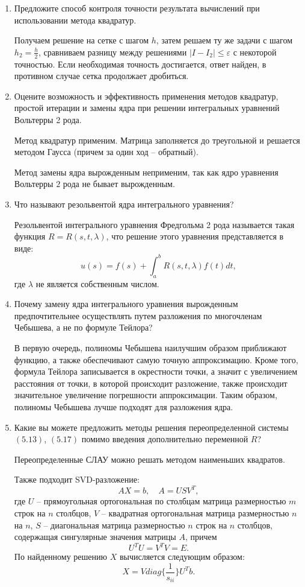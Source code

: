 \documentclass[12pt, a4paper]{article}
\begin{document}
\begin{enumerate}
\item Предложите способ контроля точности результата вычислений при использовании метода квадратур.

Получаем решение на сетке с шагом $ h $, затем решаем ту же задачи с шагом  $ h_2 = \frac{h}{2} $, сравниваем разницу между решениями $ |I -I_2| \leq \varepsilon $ с некоторой точностью. Если необходимая точность достигается, ответ найден, в противном случае сетка продолжает дробиться.  

\item Оцените возможность и эффективность применения методов квадратур, простой итерации и замены ядра при решении интегральных уравнений Вольтерры 2 рода.

Метод квадратур применим. Матрица заполняется до треугольной и решается методом Гаусса (причем за один ход – обратный). 

Метод замены ядра вырожденным неприменим, так как ядро уравнения Вольтерры $2$ рода не бывает вырожденным.

\item Что называют резольвентой ядра интегрального уравнения?

Резольвентой интегрального уравнения Фредгольма 2 рода называется такая функция $ R = R(s, t, \lambda) $, что решение этого уравнения представляется в виде:
\[
u(s) = f(s) + \displaystyle \int_a^b R(s, t, \lambda) f(t) dt,
\]
где $\lambda$ не является собственным числом.
\item Почему замену ядра интегрального уравнения вырожденным предпочтительнее осуществлять путем разложения по многочленам Чебышева, а не по формуле Тейлора?

В первую очередь, полиномы Чебышева наилучшим образом приближают функцию, а также обеспечивают самую точную аппроксимацию. Кроме того, формула Тейлора записывается в окрестности точки, а значит с увеличением расстояния от точки, в которой происходит разложение, также происходит значительное увеличение погрешности аппроксимации. Таким образом, полиномы Чебышева лучше подходят для разложения ядра.

\item Какие вы можете предложить методы решения переопределенной системы $ (5.13) $, $ (5.17) $ помимо введения дополнительно переменной $ R $?

Переопределенные СЛАУ можно решать методом наименьших квадратов.

Также подходит SVD-разложение:
\[
    AX = b, \quad A = U S V^T,
\]
\noindent где $ U $ -- прямоугольная ортогональная по столбцам матрица размерностью $m$ строк на $n$ столбцов, $ V $ -- квадратная ортогональная матрица размерностью $ n $ на $ n $, $ S $ -- диагональная матрица размерностью $n$ строк на $n$ столбцов, содержащая сингулярные значения матрицы $A$, причем 
\[
  U^T U = V^T V = E.  
\]
По найденному решению $ X $ вычисляется следующим образом:
\[
    X = V diag\{\frac{1}{s_{ii}}\} U^T b.
\]


\end{enumerate}

\newpage
\end{document}
